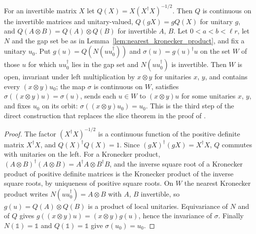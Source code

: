 \begin{lemma}
    \label{lem:kronecker_local_section}
    \leanok
    For an invertible matrix $X$ let $Q(X)=X(X^\dagger X)^{-1/2}$. Then $Q$ is
    continuous on the invertible matrices and unitary-valued, $Q(gX)=gQ(X)$ for
    unitary $g$, and $Q(A\otimes B)=Q(A)\otimes Q(B)$ for invertible $A$, $B$.
    Let $0<a<b<\ell r$, let $N$ and the gap set be as in
    Lemma~\ref{lem:nearest_kronecker_product}, and fix a unitary $u_0$. Put
    $g(u)=Q(N(uu_0^\dagger))$ and $\sigma(u)=g(u)^\dagger u$ on the set $W$ of
    those $u$ for which $uu_0^\dagger$ lies in the gap set and
    $N(uu_0^\dagger)$ is invertible. Then $W$ is open, invariant under left
    multiplication by $x\otimes y$ for unitaries $x$, $y$, and contains every
    $(x\otimes y)u_0$; the map $\sigma$ is continuous on $W$, satisfies
    $\sigma((x\otimes y)u)=\sigma(u)$, sends each $u\in W$ to $(x\otimes y)u$
    for some unitaries $x$, $y$, and fixes $u_0$ on its orbit:
    $\sigma((x\otimes y)u_0)=u_0$. This is the third step of the direct
    construction that replaces the slice theorem in the proof of
    \cite[Corollary~IV.7]{Cirac2017MPU}.
\end{lemma}

\begin{proof}\leanok
    The factor $(X^\dagger X)^{-1/2}$ is a continuous function of the positive
    definite matrix $X^\dagger X$, and $Q(X)^\dagger Q(X)=1$. Since
    $(gX)^\dagger(gX)=X^\dagger X$, $Q$ commutes with unitaries on the left. For
    a Kronecker product,
    $(A\otimes B)^\dagger(A\otimes B)=A^\dagger A\otimes B^\dagger B$, and the
    inverse square root of a Kronecker product of positive definite matrices
    is the Kronecker product of the inverse square roots, by uniqueness of
    positive square roots. On $W$ the nearest Kronecker product writes
    $N(uu_0^\dagger)=A\otimes B$ with $A$, $B$ invertible, so
    $g(u)=Q(A)\otimes Q(B)$ is a product of local unitaries. Equivariance of $N$
    and of $Q$ gives $g((x\otimes y)u)=(x\otimes y)g(u)$, hence the invariance
    of $\sigma$. Finally $N(\mathbb 1)=\mathbb 1$ and $Q(\mathbb 1)=\mathbb 1$
    give $\sigma(u_0)=u_0$.
\end{proof}

